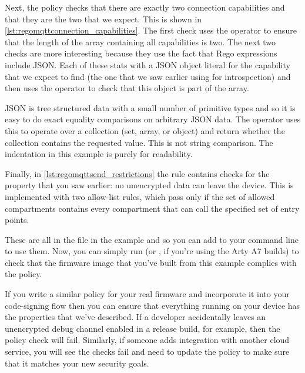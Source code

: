 \regolisting[filename=examples/mqtt/mqtt.rego,marker=network_stack,label=lst:regomqttstart,caption="The start of the Rego policy for the MQTT example."]{}

Next, the policy checks that there are exactly two connection capabilities and that they are the two that we expect.
This is shown in \ref{lst:regomqttconnection_capabilities}.
The first check uses the  operator to ensure that the length of the array containing all capabilities is two.
The next two checks are more interesting because they use the fact that Rego expressions include JSON.
Each of these stats with a JSON object literal for the capability that we expect to find (the one that we saw earlier using  for introspection) and then uses the  operator to check that this object is part of the array.

JSON is tree structured data with a small number of primitive types and so it is easy to do exact equality comparisons on arbitrary JSON data.
The  operator uses this to operate over a collection (set, array, or object) and return whether the collection contains the requested value.
This is not string comparison.
The indentation in this example is purely for readability.

\regolisting[filename=examples/mqtt/mqtt.rego,marker=connection_capabilities,label=lst:regomqttconnection_capabilities,caption="Rego rules for restricting output in the MQTT example."]{}

Finally, in \ref{lst:regomqttsend_restrictions} the rule contains checks for the property that you saw earlier: no unencrypted data can leave the device.
This is implemented with two allow-list rules, which pass only if the set of allowed compartments contains every compartment that can call the specified set of entry points.

\regolisting[filename=examples/mqtt/mqtt.rego,marker=send_restrictions,label=lst:regomqttsend_restrictions,caption="Rego rules to ensure that no data leaves the device unencrypted for the MQTT example."]{}

These are all in the  file in the example and so you can add  to your  command line to use them.
Now, you can simply run  (or , if you're using the Arty A7 builds) to check that the firmware image that you've built from this example complies with the policy.

If you write a similar policy for your real firmware and incorporate it into your code-signing flow then you can ensure that everything running on your device has the properties that we've described.
If a developer accidentally leaves an unencrypted debug channel enabled in a release build, for example, then the policy check will fail.
Similarly, if someone adds integration with another cloud service, you will see the checks fail and need to update the policy to make sure that it matches your new security goals.

